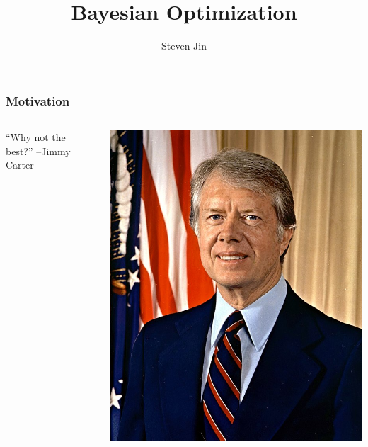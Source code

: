 \documentclass{beamer}
\title{Bayesian Optimization}
\author{Steven Jin}
\begin{document}
\begin{frame}
    \titlepage
\end{frame}

\begin{frame}
    \frametitle{Motivation}
    \begin{columns}
        \begin{column}{0.5\textwidth}
            ``Why not the best?'' --Jimmy Carter
        \end{column}
        \begin{column}{0.5\textwidth}
            \includegraphics[width=\textwidth]{fig/JimmyCarterPortrait2.jpg}
        \end{column}
    \end{columns}
\end{frame}
\end{document}
